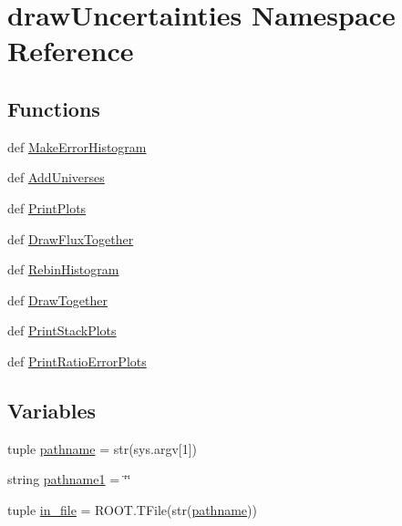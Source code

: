\hypertarget{namespacedraw_uncertainties}{\section{draw\-Uncertainties Namespace Reference}
\label{namespacedraw_uncertainties}
}
\subsection*{Functions}
\begin{DoxyCompactItemize}
\item 
def \hyperlink{namespacedraw_uncertainties_a71b82db5bc399553d8d56d4d8ce2b18e}{Make\-Error\-Histogram}
\item 
def \hyperlink{namespacedraw_uncertainties_a5f3f19737fb7c47a3c667b8302147051}{Add\-Universes}
\item 
def \hyperlink{namespacedraw_uncertainties_ae12ee4fc0c28f6a1d7b52d471e03986f}{Print\-Plots}
\item 
def \hyperlink{namespacedraw_uncertainties_a7290b59dd74403a9db20d6aaf70e93a6}{Draw\-Flux\-Together}
\item 
def \hyperlink{namespacedraw_uncertainties_a5bc9e5d65362bd3fc2fcf03940d6725f}{Rebin\-Histogram}
\item 
def \hyperlink{namespacedraw_uncertainties_a29036b3dc1e10114e516f30329a1432a}{Draw\-Together}
\item 
def \hyperlink{namespacedraw_uncertainties_a75534d4e7a659ff593417f2457bc3da4}{Print\-Stack\-Plots}
\item 
def \hyperlink{namespacedraw_uncertainties_aa087fc0e5505d449e4c4c78ba8dc59c5}{Print\-Ratio\-Error\-Plots}
\end{DoxyCompactItemize}
\subsection*{Variables}
\begin{DoxyCompactItemize}
\item 
tuple \hyperlink{namespacedraw_uncertainties_a50e3d2dc06f1d99f2bd8e5e6d1154884}{pathname} = str(sys.\-argv\mbox{[}1\mbox{]})
\item 
string \hyperlink{namespacedraw_uncertainties_aef917564a3adce487822fc487ef606df}{pathname1} = \char`\"{}\char`\"{}
\item 
tuple \hyperlink{namespacedraw_uncertainties_ab8c6ba7f1f9b613593d7766761fc1f59}{in\-\_\-file} = R\-O\-O\-T.\-T\-File(str(\hyperlink{namespacedraw_uncertainties_a50e3d2dc06f1d99f2bd8e5e6d1154884}{pathname}))
\end{DoxyCompactItemize}


